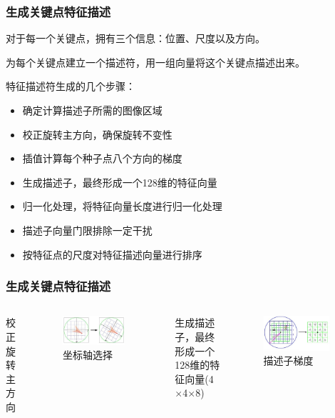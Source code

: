 \documentclass[presentation,aspectratio=1610]{beamer}
\begin{document}
\begin{frame}
	\frametitle{生成关键点特征描述}
	对于每一个关键点，拥有三个信息：位置、尺度以及方向。
	
	为每个关键点建立一个描述符，用一组向量将这个关键点描述出来。\vspace{.9cm}\pause
	
	特征描述符生成的几个步骤：
	\begin{itemize}
		\item 确定计算描述子所需的图像区域 \pause
		\item {\color{red} 校正旋转主方向，确保旋转不变性}\pause
		\item 插值计算每个种子点八个方向的梯度 \pause
		\item {\color{red} 生成描述子，最终形成一个128维的特征向量} \pause
		\item 归一化处理，将特征向量长度进行归一化处理 \pause
		\item 描述子向量门限排除一定干扰 \pause
		\item 按特征点的尺度对特征描述向量进行排序
	\end{itemize}
\end{frame}


\begin{frame}
	\frametitle{生成关键点特征描述}
	\begin{columns}
		校正旋转主方向
		
	\begin{figure}[htbp!]
		\centering
		\includegraphics[width=0.9\textwidth]{img/zhuan.jpg}
		\caption{坐标轴选择}
	\end{figure}		
		生成描述子，最终形成一个128维的特征向量(4$\times$4$\times$8)
		
	\begin{figure}[htbp!]
		\centering
		\includegraphics[width=0.9\textwidth]{img/zhifangtu.jpg}
		\caption{描述子梯度}
	\end{figure}	
	\end{columns}
\end{frame}
\end{document}
